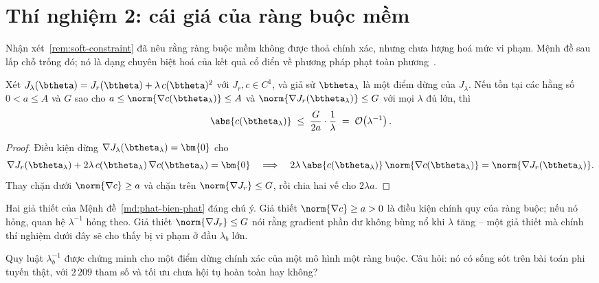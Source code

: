 \section{Thí nghiệm 2: cái giá của ràng buộc mềm}
\label{sec:tn2}
 
Nhận xét~\ref{rem:soft-constraint} đã nêu rằng ràng buộc mềm không được thoả
chính xác, nhưng chưa lượng hoá mức vi phạm. Mệnh đề sau lấp chỗ trống đó; nó là
dạng chuyên biệt hoá của kết quả cổ điển về phương pháp phạt toàn
phương~\cite{nocedal2006}.
 
\begin{menhde}
\label{md:phat-bien-phat}
Xét $J_{\lambda}(\btheta) = J_r(\btheta) + \lambda\, c(\btheta)^2$ với
$J_r, c \in C^1$, và giả sử $\btheta_{\lambda}$ là một điểm dừng của
$J_{\lambda}$. Nếu tồn tại các hằng số $0 < a \le A$ và $G$ sao cho
$a \le \norm{\nabla c(\btheta_{\lambda})} \le A$ và
$\norm{\nabla J_r(\btheta_{\lambda})} \le G$ với mọi $\lambda$ đủ lớn, thì
\begin{equation}
\abs{c(\btheta_{\lambda})} \;\le\; \frac{G}{2a}\cdot\frac{1}{\lambda}
 \;=\; \mathcal{O}\!\left(\lambda^{-1}\right).
\label{eq:phat-bac-nhat}
\end{equation}
\end{menhde}
 
\begin{proof}
Điều kiện dừng $\nabla J_{\lambda}(\btheta_{\lambda}) = \bm{0}$ cho
\[
\nabla J_r(\btheta_{\lambda})
 + 2\lambda\, c(\btheta_{\lambda})\,\nabla c(\btheta_{\lambda}) = \bm{0}
\quad\Longrightarrow\quad
2\lambda\,\abs{c(\btheta_{\lambda})}\,\norm{\nabla c(\btheta_{\lambda})}
 = \norm{\nabla J_r(\btheta_{\lambda})} .
\]
Thay chặn dưới $\norm{\nabla c} \ge a$ và chặn trên
$\norm{\nabla J_r} \le G$, rồi chia hai vế cho $2\lambda a$.
\end{proof}
 
Hai giả thiết của Mệnh đề~\ref{md:phat-bien-phat} đáng chú ý. Giả thiết
$\norm{\nabla c} \ge a > 0$ là điều kiện chính quy của ràng buộc; nếu nó hỏng,
quan hệ $\lambda^{-1}$ hỏng theo. Giả thiết $\norm{\nabla J_r} \le G$ nói rằng
gradient phần dư không bùng nổ khi $\lambda$ tăng -- một giả thiết mà chính thí
nghiệm dưới đây sẽ cho thấy bị vi phạm ở đầu $\lambda_b$ lớn.
 
\begin{thinghiem}
\label{tn:lambda}
Quy luật $\lambda_b^{-1}$ được chứng minh cho một điểm dừng chính xác của một mô
hình một ràng buộc. Câu hỏi: nó có sống sót trên bài toán phi tuyến thật, với
$2\,209$ tham số và tối ưu chưa hội tụ hoàn toàn hay không?
\end{thinghiem}
 
